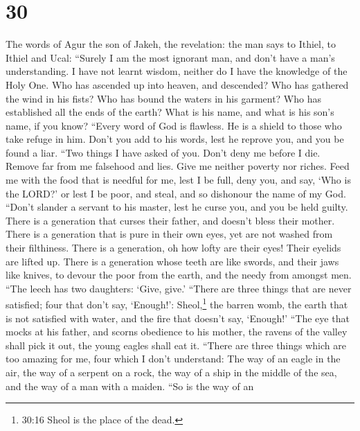 \hypertarget{section-25}{%
\section{30}\label{section-25}}

 The words of Agur the son of Jakeh, the revelation: the man
says to Ithiel, to Ithiel and Ucal:  ``Surely I am the most
ignorant man, and don't have a man's understanding.  I have
not learnt wisdom, neither do I have the knowledge of the Holy One.
 Who has ascended up into heaven, and descended? Who has
gathered the wind in his fists? Who has bound the waters in his garment?
Who has established all the ends of the earth? What is his name, and
what is his son's name, if you know?  ``Every word of God is
flawless. He is a shield to those who take refuge in him. 
Don't you add to his words, lest he reprove you, and you be found a
liar.  ``Two things I have asked of you. Don't deny me
before I die.  Remove far from me falsehood and lies. Give
me neither poverty nor riches. Feed me with the food that is needful for
me,  lest I be full, deny you, and say, `Who is the LORD?'
or lest I be poor, and steal, and so dishonour the name of my God.
 ``Don't slander a servant to his master, lest he curse
you, and you be held guilty.  There is a generation that
curses their father, and doesn't bless their mother.  There
is a generation that is pure in their own eyes, yet are not washed from
their filthiness.  There is a generation, oh how lofty are
their eyes! Their eyelids are lifted up.  There is a
generation whose teeth are like swords, and their jaws like knives, to
devour the poor from the earth, and the needy from amongst men.
 ``The leech has two daughters: `Give, give.' ``There are
three things that are never satisfied; four that don't say, `Enough!':
 Sheol,\footnote{30:16 Sheol is the place of the dead.} the
barren womb, the earth that is not satisfied with water, and the fire
that doesn't say, `Enough!'  ``The eye that mocks at his
father, and scorns obedience to his mother, the ravens of the valley
shall pick it out, the young eagles shall eat it.  ``There
are three things which are too amazing for me, four which I don't
understand:  The way of an eagle in the air, the way of a
serpent on a rock, the way of a ship in the middle of the sea, and the
way of a man with a maiden.  ``So is the way of an
